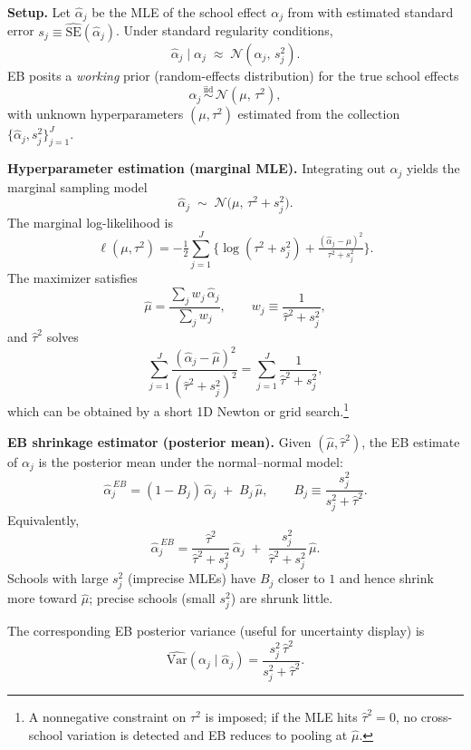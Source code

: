\medskip
\noindent\textbf{Setup.}
Let $\widehat{\alpha}_j$ be the MLE of the school effect $\alpha_j$ from  with estimated standard error $s_j \equiv \widehat{\mathrm{SE}}(\widehat{\alpha}_j)$. Under standard regularity conditions,
\[
\widehat{\alpha}_j \;\big|\; \alpha_j \;\approx\; \mathcal{N}(\alpha_j,\, s_j^2).
\]
EB posits a \emph{working} prior (random-effects distribution) for the true school effects
\[
\alpha_j \,\stackrel{\text{iid}}{\sim}\, \mathcal{N}(\mu,\, \tau^2),
\]
with unknown hyperparameters $(\mu,\tau^2)$ estimated from the collection $\{\widehat{\alpha}_j,s_j^2\}_{j=1}^J$.

\medskip
\noindent\textbf{Hyperparameter estimation (marginal MLE).}
Integrating out $\alpha_j$ yields the marginal sampling model
\[
\widehat{\alpha}_j \;\sim\; \mathcal{N}\!\big(\mu,\, \tau^2 + s_j^2\big).
\]
The marginal log-likelihood is
\[
\ell(\mu,\tau^2)
= -\tfrac{1}{2}\sum_{j=1}^J\Big\{
\log(\tau^2 + s_j^2)
+ \tfrac{(\widehat{\alpha}_j - \mu)^2}{\tau^2 + s_j^2}
\Big\}.
\]
The maximizer satisfies
\[
\widehat{\mu}
= \frac{\sum_{j} w_j\,\widehat{\alpha}_j}{\sum_{j} w_j},
\qquad
w_j \equiv \frac{1}{\widehat{\tau}^2 + s_j^2},
\]
and $\widehat{\tau}^2$ solves
\[
\sum_{j=1}^J
\frac{(\widehat{\alpha}_j - \widehat{\mu})^2}{(\widehat{\tau}^2 + s_j^2)^2}
= \sum_{j=1}^J \frac{1}{\widehat{\tau}^2 + s_j^2},
\]
which can be obtained by a short 1D Newton or grid search.\footnote{A nonnegative constraint on $\tau^2$ is imposed; if the MLE hits $\widehat{\tau}^2=0$, no cross-school variation is detected and EB reduces to pooling at $\widehat{\mu}$.}

\medskip
\noindent\textbf{EB shrinkage estimator (posterior mean).}
Given $(\widehat{\mu},\widehat{\tau}^2)$, the EB estimate of $\alpha_j$ is the posterior mean under the normal–normal model:
\[
\widehat{\alpha}^{\,EB}_j
= (1-B_j)\,\widehat{\alpha}_j \;+\; B_j\,\widehat{\mu},
\qquad
B_j \equiv \frac{s_j^2}{s_j^2 + \widehat{\tau}^2}.
\]
Equivalently,
\[
\widehat{\alpha}^{\,EB}_j
= \frac{\widehat{\tau}^2}{\widehat{\tau}^2 + s_j^2}\,\widehat{\alpha}_j
\;+\;
\frac{s_j^2}{\widehat{\tau}^2 + s_j^2}\,\widehat{\mu}.
\]
Schools with large $s_j^2$ (imprecise MLEs) have $B_j$ closer to $1$ and hence shrink more toward $\widehat{\mu}$; precise schools (small $s_j^2$) are shrunk little.

The corresponding EB posterior variance (useful for uncertainty display) is
\[
\widehat{\mathrm{Var}}(\alpha_j \mid \widehat{\alpha}_j)
= \frac{s_j^2\,\widehat{\tau}^2}{s_j^2 + \widehat{\tau}^2}.
\]

